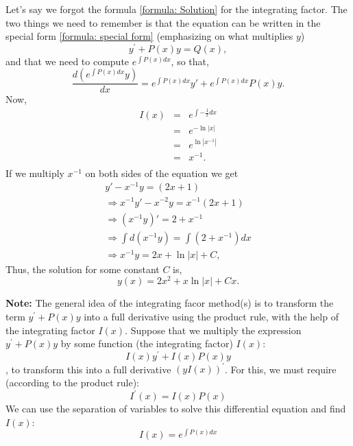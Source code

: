 \documentclass[11pt]{article}
\begin{document}
\begin{solution}
Let's say we forgot the formula \eqref{formula: Solution} for the integrating factor. The two things we need to remember is that the equation can be written in the special form \eqref{formula: special form} (emphasizing on what multiplies $y$)
\begin{equation*}
y^{\prime} + P(x) y = Q(x),
\end{equation*}
and that we need to compute $e^{\int P(x)dx}$, so that,
\begin{equation*}
     \frac{d(e^{\int P(x)dx} y)}{dx} = e^{\int P(x)dx} y' + e^{\int P(x)dx}P(x) y.
\end{equation*}
Now, 
\begin{eqnarray*}
I(x) & = & e^{\int - \frac{1 }{x} dx} \\
& = & e^{-\ln|x|} \\
& = & e^{\ln|x^{-1}|} \\
& = & x^{-1}. \\
\end{eqnarray*}
If we multiply $x^{-1}$ on both sides of the equation we get
\begin{gather*}
     y' - x^{-1}y = (2x +1)\\
     \Rightarrow x^{-1}y' - x^{-2}y = x^{-1}(2x +1)\\
     \Rightarrow (x^{-1}y)'=2 + x^{-1}\\
     \Rightarrow \int d(x^{-1}y) = \int (2 +x^{-1})dx\\
     \Rightarrow x^{-1} y = 2x +\ln |x| + C,
\end{gather*}
Thus, the solution for some constant $C$ is, 
\begin{equation*}
     \boxed{y(x) = 2 x^{2} +x\ln |x| +C x}.
\end{equation*}

\end{solution}

\textbf{Note:}
The general idea of the integrating facor method(s) is to transform the
term $y^{\prime} + P(x) y$ into a full derivative using the product rule,
with the help of the integrating factor $I(x)$. Suppose that we multiply the
expression $y^{\prime} + P(x) y$ by some function (the integrating factor)
$I(x)$:
\[ I(x) y^{\prime} + I(x) P(x) y \],
to transform this into a full derivative $\left( y I(x) \right)^{\prime}$.
For this, we must require (according to the product rule):
\[ I^{\prime}(x) = I(x) P(x) \]
We can use the separation of variables to solve this differential equation
and find $I(x)$:
\[ I(x) = e^{\int P(x)dx}\]
\end{document}
